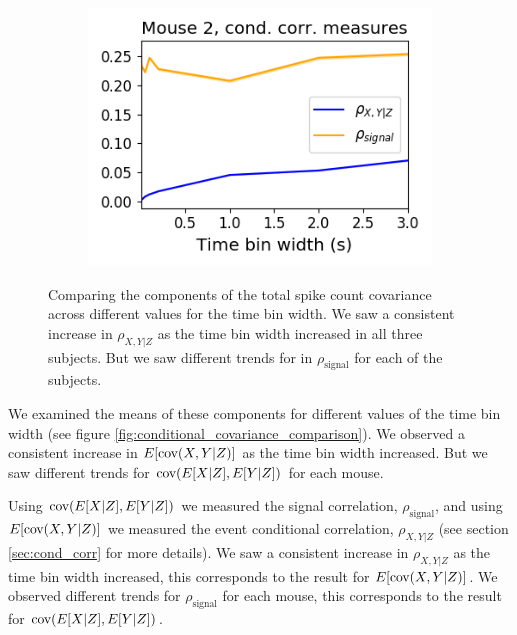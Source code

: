 \begin{figure}[h]
\begin{subfigure}[h]{0.5\linewidth}
      \includegraphics[width=\linewidth]{figures/eight_probe/Robbins_cond_corr_comparison.png}
      \label{fig:Robbins_cond_corr_comparison}
    \end{subfigure}
    \caption{Comparing the components of the total spike count covariance across different values for the time bin width. We saw a consistent increase in $\rho_{X,Y|Z}$ as the time bin width increased in all three subjects. But we saw different trends for in $\rho_{\text{signal}}$ for each of the subjects.}
    \label{fig:conditional_correlation_comparison}
  \end{figure}

  We examined the means of these components for different values of the time bin width (see figure \ref{fig:conditional_covariance_comparison}). We observed a consistent increase in $E[\text{cov} (X,Y|Z)]$ as the time bin width increased. But we saw different trends for $\text{cov} (E[X|Z], E[Y|Z])$ for each mouse.

  Using $\text{cov} (E[X|Z], E[Y|Z])$ we measured the signal correlation, $\rho_{\text{signal}}$, and using $E[\text{cov} (X,Y|Z)]$ we measured the event conditional correlation, $\rho_{X,Y|Z}$ (see section \ref{sec:cond_corr} for more details). We saw a consistent increase in $\rho_{X,Y|Z}$ as the time bin width increased, this corresponds to the result for $E[\text{cov}(X,Y|Z)]$. We observed different trends for $\rho_{\text{signal}}$ for each mouse, this corresponds to the result for $\text{cov}(E[X|Z],E[Y|Z])$.

